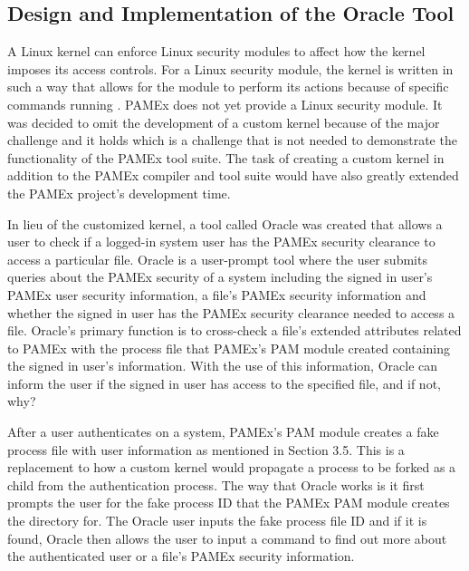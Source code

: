 \vspace{\baselineskip}

\subsection{Design and Implementation of the Oracle Tool}
\par 
\vspace{\baselineskip}
\hspace{1em}
A Linux kernel can enforce Linux security modules to affect how the kernel imposes its access controls.
For a Linux security module, the kernel is written in such a way that 
allows for the module to perform its actions because of specific 
commands running \cite{kerneldocs}. PAMEx does not yet provide a Linux security module. 
It was decided to omit the development of a custom kernel because of the 
major challenge and it holds which is a challenge that is not needed to demonstrate the  
functionality of the PAMEx tool suite. The task of creating a custom 
kernel in addition to the PAMEx compiler and tool suite would have also 
greatly extended the PAMEx project’s development time.  

In lieu of the customized kernel, a tool called 
Oracle was created that allows a user to check if a logged-in system user has the 
PAMEx security clearance to access a particular file. Oracle is a 
user-prompt tool where the user submits queries about the PAMEx 
security of a system including the signed in user’s PAMEx user security 
information, a file’s PAMEx security information and whether the signed 
in user has the PAMEx security clearance needed to access a file. 
Oracle’s primary function is to cross-check a file’s extended 
attributes related to PAMEx with the process file that PAMEx’s PAM 
module created containing the signed in user’s information. With the 
use of this information, Oracle can inform the user if the signed in 
user has access to the specified file, and if not, why? 

After a user authenticates on a system, PAMEx's PAM module creates a fake
process file with user information as mentioned in Section 3.5.
This is a replacement to how a custom kernel would propagate a process
to be forked as a child from the authentication process. 
The way that Oracle works is it first prompts the user for the fake 
process ID that the PAMEx PAM module creates the directory for. The 
Oracle user inputs the fake process file ID and if it is found, Oracle then 
allows the user to input a command to find out more about the 
authenticated user or a file’s PAMEx security information.  

